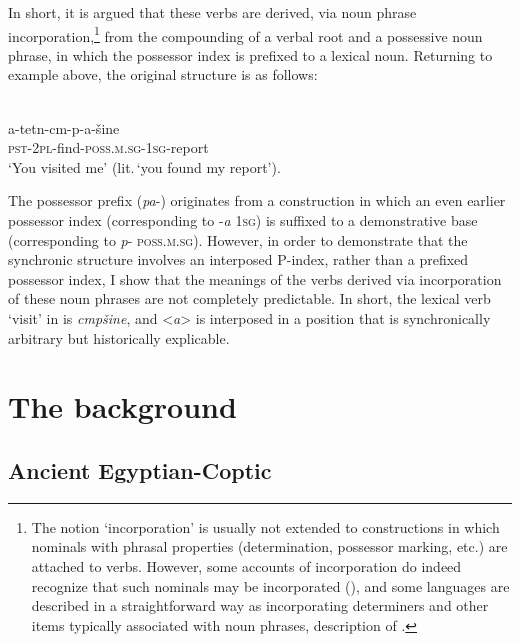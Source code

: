 \documentclass[output=paper]{LSP/langsci}
\begin{document}
In short, it is argued that these verbs are derived, via noun phrase incorporation,\footnote{The notion ‘incorporation’ is usually not extended to constructions in which nominals with phrasal properties (\eg determination, possessor marking, etc.) are attached to verbs. However, some accounts of incorporation do indeed recognize that such nominals may be incorporated (\eg \citealt{Aikhenvald2007Typological,Grossman2016Noun}), and some languages are described in a straightforward way as incorporating determiners and other items typically associated with noun phrases, \eg {} description of .} from the compounding of a verbal root and a possessive noun phrase, in which the possessor index is prefixed to a lexical noun. Returning to example  above, the original structure is as follows:

\begin{exe}
\ex%
\label{05-gr-ex:7}
\\
\gll a-tetn-cm-p-a-šine\\
\textsc{pst-2pl}-find-\textsc{poss.m.sg-1sg}-report\\
\glt ‘You visited me’ (lit.\,‘you found my report’). %
\end{exe}

The possessor prefix (\textit{pa}-) originates from a construction in which an even earlier possessor index (corresponding to  -\textit{a} \textsc{1sg}) is suffixed to a demonstrative base (corresponding to  \textit{p}- \textsc{poss.m.sg}). However, in order to demonstrate that the synchronic structure involves an interposed P-index, rather than a prefixed possessor index, I show that the meanings of the verbs derived via incorporation of these noun phrases are not completely predictable. In short, the lexical verb ‘visit’ in  is \textit{cmp}\textit{šine}, and <\textit{a}> is interposed in a position that is synchronically arbitrary but historically explicable.

\section{The background}
\label{05-sec:3}

\subsection{Ancient Egyptian-Coptic}
\label{05-subsec:3-1}
\end{document}
